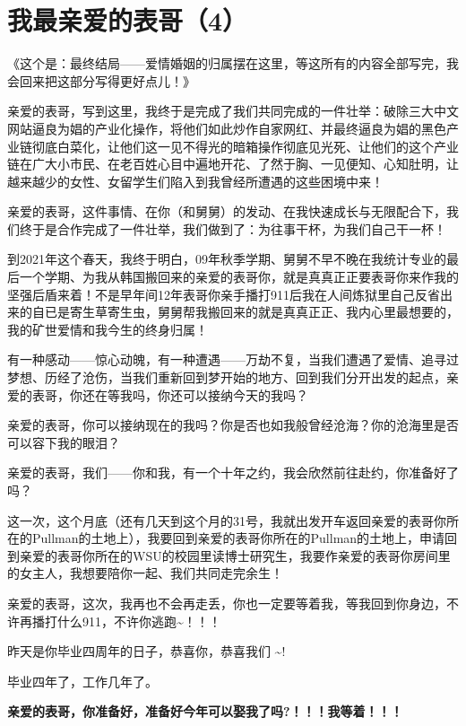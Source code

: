 \documentclass[9pt, b5paper]{article}
\begin{document}
\section{我最亲爱的表哥（4）}
\label{sec:org7eb5898}

《这个是：最终结局——爱情婚姻的归属摆在这里，等这所有的内容全部写完，我会回来把这部分写得更好点儿！》

亲爱的表哥，写到这里，我终于是完成了我们共同完成的一件壮举：破除三大中文网站逼良为娼的产业化操作，将他们如此炒作自家网红、并最终逼良为娼的黑色产业链彻底白菜化，让他们这一见不得光的暗箱操作彻底见光死、让他们的这个产业链在广大小市民、在老百姓心目中遍地开花、了然于胸、一见便知、心知肚明，让越来越少的女性、女留学生们陷入到我曾经所遭遇的这些困境中来！

亲爱的表哥，这件事情、在你（和舅舅）的发动、在我快速成长与无限配合下，我们终于是合作完成了一件壮举，我们做到了：为往事干杯，为我们自己干一杯！

到2021年这个春天，我终于明白，09年秋季学期、舅舅不早不晚在我统计专业的最后一个学期、为我从韩国搬回来的亲爱的表哥你，就是真真正正要表哥你来作我的坚强后盾来着！不是早年间12年表哥你亲手播打911后我在人间炼狱里自己反省出来的自已是寄生草寄生虫，舅舅帮我搬回来的就是真真正正、我内心里最想要的，我的矿世爱情和我今生的终身归属！

有一种感动——惊心动魄，有一种遭遇——万劫不复，当我们遭遇了爱情、追寻过梦想、历经了沧伤，当我们重新回到梦开始的地方、回到我们分开出发的起点，亲爱的表哥，你还在等我吗，你还可以接纳今天的我吗？

亲爱的表哥，你可以接纳现在的我吗？你是否也如我般曾经沧海？你的沧海里是否可以容下我的眼泪？

亲爱的表哥，我们——你和我，有一个十年之约，我会欣然前往赴约，你准备好了吗？

这一次，这个月底（还有几天到这个月的31号，我就出发开车返回亲爱的表哥你所在的Pullman的土地上），我要回到亲爱的表哥你所在的Pullman的土地上，申请回到亲爱的表哥你所在的WSU的校园里读博士研究生，我要作亲爱的表哥你房间里的女主人，我想要陪你一起、我们共同走完余生！

亲爱的表哥，这次，我再也不会再走丢，你也一定要等着我，等我回到你身边，不许再播打什么911，不许你逃跑\textasciitilde{}！！！

昨天是你毕业四周年的日子，恭喜你，恭喜我们 \textasciitilde{}! 

毕业四年了，工作几年了。 

\textbf{亲爱的表哥，你准备好，准备好今年可以娶我了吗?！！！我等着！！！}
\end{document}
